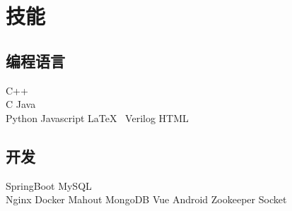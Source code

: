 \documentclass[]{deedy-resume-openfont}
\begin{document}
\begin{minipage}[t]{0.25\textwidth}

\section{技能}
\sectionsep
\subsection{编程语言}
C++ \\
C \textbullet{} Java \\
Python \textbullet{} Javascript \textbullet{} \LaTeX\ \textbullet{} Verilog \textbullet{} HTML \\ 
\sectionsep

\subsection{开发}
SpringBoot  \textbullet{} MySQL \\
Nginx \textbullet{} Docker \textbullet{} Mahout \textbullet{} MongoDB \textbullet{} Vue \textbullet{} Android \textbullet{} Zookeeper \textbullet{} Socket\\
\sectionsep


%
%

\end{minipage} 
\hfill
\end{document}
